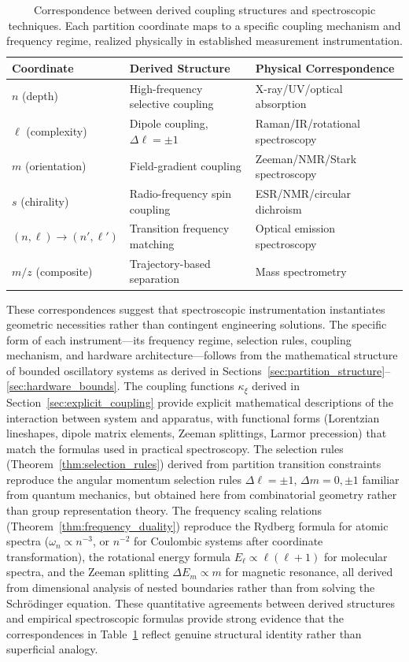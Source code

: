 \documentclass[twocolumn,10pt,a4paper]{article}
\theoremstyle{remark}
\begin{document}
\begin{table}[h]
\centering
\begin{tabular}{lll}
\toprule
\textbf{Coordinate} & \textbf{Derived Structure} & \textbf{Physical Correspondence} \\
\midrule
$n$ (depth) & High-frequency selective coupling & X-ray/UV/optical absorption \\
$\ell$ (complexity) & Dipole coupling, $\Delta\ell = \pm 1$ & Raman/IR/rotational spectroscopy \\
$m$ (orientation) & Field-gradient coupling & Zeeman/NMR/Stark spectroscopy \\
$s$ (chirality) & Radio-frequency spin coupling & ESR/NMR/circular dichroism \\
$(n, \ell) \to (n', \ell')$ & Transition frequency matching & Optical emission spectroscopy \\
$m/z$ (composite) & Trajectory-based separation & Mass spectrometry \\
\bottomrule
\end{tabular}
\caption{Correspondence between derived coupling structures and spectroscopic techniques. Each partition coordinate maps to a specific coupling mechanism and frequency regime, realized physically in established measurement instrumentation.}
\label{tab:correspondences}
\end{table}

These correspondences suggest that spectroscopic instrumentation instantiates geometric necessities rather than contingent engineering solutions. The specific form of each instrument—its frequency regime, selection rules, coupling mechanism, and hardware architecture—follows from the mathematical structure of bounded oscillatory systems as derived in Sections~\ref{sec:partition_structure}--\ref{sec:hardware_bounds}. The coupling functions $\kappa_\xi$ derived in Section~\ref{sec:explicit_coupling} provide explicit mathematical descriptions of the interaction between system and apparatus, with functional forms (Lorentzian lineshapes, dipole matrix elements, Zeeman splittings, Larmor precession) that match the formulas used in practical spectroscopy. The selection rules (Theorem~\ref{thm:selection_rules}) derived from partition transition constraints reproduce the angular momentum selection rules $\Delta\ell = \pm 1$, $\Delta m = 0, \pm 1$ familiar from quantum mechanics, but obtained here from combinatorial geometry rather than group representation theory. The frequency scaling relations (Theorem~\ref{thm:frequency_duality}) reproduce the Rydberg formula for atomic spectra ($\omega_n \propto n^{-3}$, or $n^{-2}$ for Coulombic systems after coordinate transformation), the rotational energy formula $E_\ell \propto \ell(\ell+1)$ for molecular spectra, and the Zeeman splitting $\Delta E_m \propto m$ for magnetic resonance, all derived from dimensional analysis of nested boundaries rather than from solving the Schrödinger equation. These quantitative agreements between derived structures and empirical spectroscopic formulas provide strong evidence that the correspondences in Table~\ref{tab:correspondences} reflect genuine structural identity rather than superficial analogy.
\end{document}
